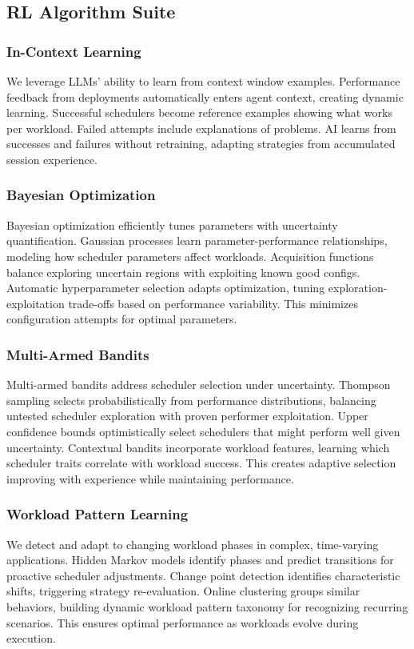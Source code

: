 \subsection{RL Algorithm Suite}

\subsubsection{In-Context Learning}
We leverage LLMs' ability to learn from context window examples. Performance feedback from deployments automatically enters agent context, creating dynamic learning. Successful schedulers become reference examples showing what works per workload. Failed attempts include explanations of problems. AI learns from successes and failures without retraining, adapting strategies from accumulated session experience.

\subsubsection{Bayesian Optimization}
Bayesian optimization efficiently tunes parameters with uncertainty quantification. Gaussian processes learn parameter-performance relationships, modeling how scheduler parameters affect workloads. Acquisition functions balance exploring uncertain regions with exploiting known good configs. Automatic hyperparameter selection adapts optimization, tuning exploration-exploitation trade-offs based on performance variability. This minimizes configuration attempts for optimal parameters.

\subsubsection{Multi-Armed Bandits}
Multi-armed bandits address scheduler selection under uncertainty. Thompson sampling selects probabilistically from performance distributions, balancing untested scheduler exploration with proven performer exploitation. Upper confidence bounds optimistically select schedulers that might perform well given uncertainty. Contextual bandits incorporate workload features, learning which scheduler traits correlate with workload success. This creates adaptive selection improving with experience while maintaining performance.

\subsubsection{Workload Pattern Learning}
We detect and adapt to changing workload phases in complex, time-varying applications. Hidden Markov models identify phases and predict transitions for proactive scheduler adjustments. Change point detection identifies characteristic shifts, triggering strategy re-evaluation. Online clustering groups similar behaviors, building dynamic workload pattern taxonomy for recognizing recurring scenarios. This ensures optimal performance as workloads evolve during execution.

